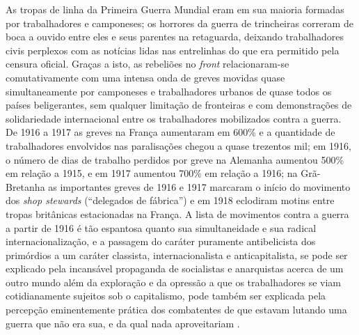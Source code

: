 As tropas de linha da Primeira Guerra Mundial eram em sua maioria formadas por trabalhadores e camponeses; os horrores da guerra de trincheiras correram de boca a ouvido entre eles e seus parentes na retaguarda, deixando trabalhadores civis perplexos com as notícias lidas nas entrelinhas do que era permitido pela censura oficial. Graças a isto, as rebeliões no \textit{front} relacionaram-se comutativamente com uma intensa onda de greves movidas quase simultaneamente por camponeses e trabalhadores urbanos de quase todos os países beligerantes, sem qualquer limitação de fronteiras e com demonstrações de solidariedade internacional entre os trabalhadores mobilizados contra a guerra. De 1916 a 1917 as greves na França aumentaram em 600\% e a quantidade de trabalhadores envolvidos nas paralisações chegou a quase trezentos mil; em 1916, o número de dias de trabalho perdidos por greve na Alemanha aumentou 500\% em relação a 1915, e em 1917 aumentou 700\% em relação a 1916; na Grã-Bretanha as importantes greves de 1916 e 1917 marcaram o início do movimento dos \textit{shop stewards} (``delegados de fábrica'') e em 1918 eclodiram motins entre tropas britânicas estacionadas na França. A lista de movimentos contra a guerra a partir de 1916 é tão espantosa quanto sua simultaneidade e sua radical internacionalização, e a passagem do caráter puramente antibelicista dos primórdios a um caráter classista, internacionalista e anticapitalista, se pode ser explicado pela incansável propaganda de socialistas e anarquistas acerca de um outro mundo além da exploração e da opressão a que os trabalhadores se viam cotidianamente sujeitos sob o capitalismo, pode também ser explicada pela percepção eminentemente prática dos combatentes de que estavam lutando uma guerra que não era sua, e da qual nada aproveitariam \cite[p.~232-251]{bernardo_fascismo_2015}.

